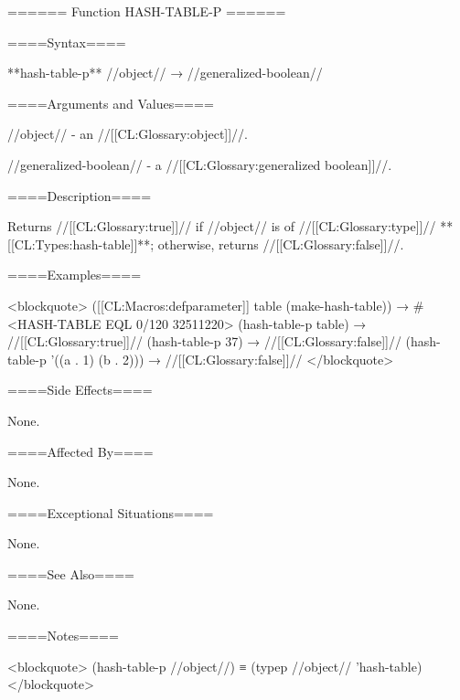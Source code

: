 ====== Function HASH-TABLE-P ======

====Syntax====

**hash-table-p** //object// → //generalized-boolean//

====Arguments and Values====

//object// - an //[[CL:Glossary:object]]//.

//generalized-boolean// - a //[[CL:Glossary:generalized boolean]]//.

====Description====

Returns //[[CL:Glossary:true]]// if //object// is of //[[CL:Glossary:type]]// **[[CL:Types:hash-table]]**; otherwise, returns //[[CL:Glossary:false]]//.

====Examples====

<blockquote> ([[CL:Macros:defparameter]] table (make-hash-table)) → #<HASH-TABLE EQL 0/120 32511220> (hash-table-p table) → //[[CL:Glossary:true]]// (hash-table-p 37) → //[[CL:Glossary:false]]// (hash-table-p '((a . 1) (b . 2))) → //[[CL:Glossary:false]]// </blockquote>

====Side Effects====

None.

====Affected By====

None.

====Exceptional Situations====

None.

====See Also====

None.

====Notes====

<blockquote> (hash-table-p //object//) ≡ (typep //object// 'hash-table) </blockquote>

